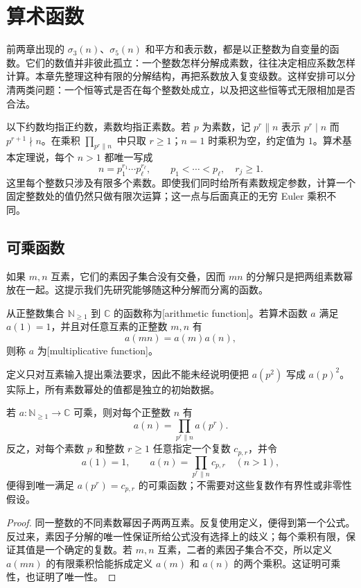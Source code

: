 \section{算术函数}
\label{b3:sec:2501}

前两章出现的 \(\sigma_3(n)\)、\(\sigma_5(n)\) 和平方和表示数，都是以正整数为自变量的函数。它们的数值并非彼此孤立：一个整数怎样分解成素数，往往决定相应系数怎样计算。本章先整理这种有限的分解结构，再把系数放入复变级数。这样安排可以分清两类问题：一个恒等式是否在每个整数处成立，以及把这些恒等式无限相加是否合法。

以下约数均指正约数，素数均指正素数。若 \(p\) 为素数，记 \(p^r\parallel n\) 表示 \(p^r\mid n\) 而 \(p^{r+1}\nmid n\)。在乘积 \(\prod_{p^r\parallel n}\) 中只取 \(r\ge1\)；\(n=1\) 时乘积为空，约定值为 \(1\)。算术基本定理说，每个 \(n>1\) 都唯一写成
\[
 n=p_1^{r_1}\cdots p_\ell^{r_\ell},
 \qquad p_1<\cdots<p_\ell,\quad r_j\ge1.
\]
这里每个整数只涉及有限多个素数。即使我们同时给所有素数规定参数，计算一个固定整数处的值仍然只做有限次运算；这一点与后面真正的无穷 Euler 乘积不同。

\subsection{可乘函数}
\label{b3:subsec:250101}

如果 \(m,n\) 互素，它们的素因子集合没有交叠，因而 \(mn\) 的分解只是把两组素数幂放在一起。这提示我们先研究能够随这种分解而分离的函数。

\begin{definition}\label{b3:def:25-multiplicative}
从正整数集合 \(\mathbb N_{\ge1}\) 到 \(\mathbb C\) 的函数称为[arithmetic function]。若算术函数 \(a\) 满足 \(a(1)=1\)，并且对任意互素的正整数 \(m,n\) 有
\[
 a(mn)=a(m)a(n),
\]
则称 \(a\) 为[multiplicative function]。
\end{definition}

定义只对互素输入提出乘法要求，因此不能未经说明便把 \(a(p^2)\) 写成 \(a(p)^2\)。实际上，所有素数幂处的值都是独立的初始数据。

\begin{proposition}[素数幂决定可乘函数]
\label{b3:prop:25-prime-power-data}
若 \(a:\mathbb N_{\ge1}\to\mathbb C\) 可乘，则对每个正整数 \(n\) 有
\[
 a(n)=\prod_{p^r\parallel n}a(p^r).
\]
反之，对每个素数 \(p\) 和整数 \(r\ge1\) 任意指定一个复数 \(c_{p,r}\)，并令
\[
 a(1)=1,\qquad
 a(n)=\prod_{p^r\parallel n}c_{p,r}\quad(n>1),
\]
便得到唯一满足 \(a(p^r)=c_{p,r}\) 的可乘函数；不需要对这些复数作有界性或非零性假设。
\end{proposition}
\begin{proof}
同一整数的不同素数幂因子两两互素。反复使用定义，便得到第一个公式。反过来，素因子分解的唯一性保证所给公式没有选择上的歧义；每个乘积有限，保证其值是一个确定的复数。若 \(m,n\) 互素，二者的素因子集合不交，所以定义 \(a(mn)\) 的有限乘积恰能拆成定义 \(a(m)\) 和 \(a(n)\) 的两个乘积。这证明可乘性，也证明了唯一性。
\end{proof}

